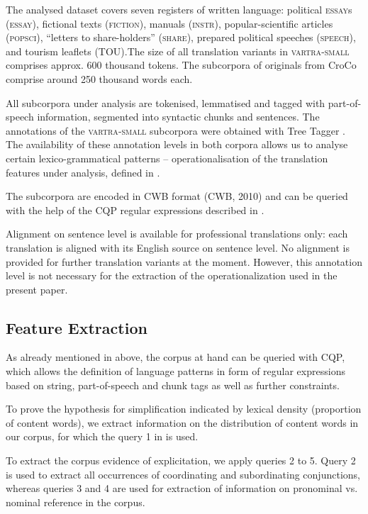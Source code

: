\documentclass[output=paper]{LSP/langsci}
\begin{document}
The analysed dataset covers seven registers of written language: political \textsc{essay}s (\textsc{essay}), fictional texts (\textsc{fiction}), manuals (\textsc{instr}), popular-scientific articles (\textsc{popsci}), “letters to share-holders” (\textsc{share}), prepared political speeches (\textsc{speech}), and tourism leaflets (TOU).The size of all translation variants in \textsc{vartra}-\textsc{small} comprises approx. 600 thousand tokens.  The subcorpora of originals from CroCo comprise around 250 thousand words each.

All subcorpora under analysis are tokenised, lemmatised and tagged with part-of-speech information, segmented into syntactic chunks and sentences.  The annotations of the \textsc{vartra}-\textsc{small} subcorpora were obtained with Tree Tagger \citep{Schmid1994}. The availability of these annotation levels in both corpora allows us to analyse certain lexico-grammatical patterns – operationalisation of the translation features under analysis, defined in .

The subcorpora are encoded in CWB format (CWB, 2010) and can be queried with the help of the CQP regular expressions described in \citep{Evert2005}.

Alignment on sentence level is available for professional translations only: each translation is aligned with its English source on sentence level.  No alignment is provided for further translation variants at the moment. However, this annotation level is not necessary for the extraction of the operationalization used in the present paper.

\subsection{Feature Extraction}
As already mentioned in  above, the corpus at hand can be queried with CQP, which allows the definition of language patterns in form of regular expressions based on string, part-of-speech and chunk tags as well as further constraints.

To prove the hypothesis for simplification indicated by lexical density (proportion of content words), we extract information on the distribution of content words in our corpus, for which the query 1 in  is used.

To extract the corpus evidence of explicitation, we apply queries 2 to 5. Query 2 is used to extract all occurrences of coordinating and subordinating conjunctions, whereas queries 3 and 4 are used for extraction of information on pronominal vs. nominal reference in the corpus. 
\end{document}
